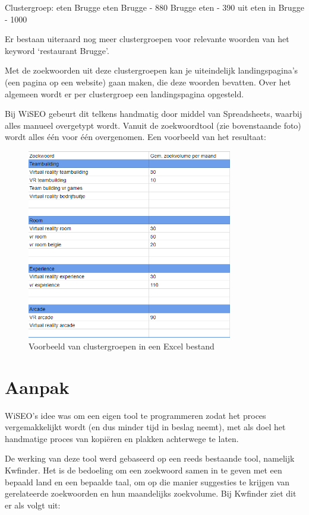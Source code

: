 Clustergroep: eten Brugge
eten Brugge - 880
Brugge eten - 390
uit eten in Brugge - 1000

Er bestaan uiteraard nog meer  clustergroepen voor relevante woorden van het keyword ‘restaurant Brugge’. 

Met de zoekwoorden uit deze clustergroepen kan je uiteindelijk landingspagina’s (een pagina op een website) gaan maken, die deze woorden bevatten. Over het algemeen wordt er per clustergroep een landingspagina opgesteld.  

Bij WiSEO gebeurt dit telkens handmatig door middel van Spreadsheets, waarbij alles manueel overgetypt wordt. Vanuit de zoekwoordtool (zie bovenstaande foto) wordt alles één voor één overgenomen. Een voorbeeld van het resultaat: 

\begin{figure}[h!]
\centering
\includegraphics[width=0.8\textwidth]{img/Clustergroepenvoorbeeld.png}
\caption{Voorbeeld van clustergroepen in een Excel bestand}
\end{figure}

\newpage
\section{Aanpak}
\label{ch: Aanpak}

WiSEO's idee was om een eigen tool te programmeren zodat het proces vergemakkelijkt wordt (en dus minder tijd in beslag neemt), met als doel het handmatige proces van kopiëren en plakken achterwege te laten. 

De werking van deze tool werd gebaseerd op een reeds bestaande tool, namelijk Kwfinder. Het is de bedoeling om een zoekwoord samen in te geven met een bepaald land en een bepaalde taal, om op die manier suggesties te krijgen van gerelateerde zoekwoorden en hun maandelijks zoekvolume. Bij Kwfinder ziet dit er als volgt uit: 

